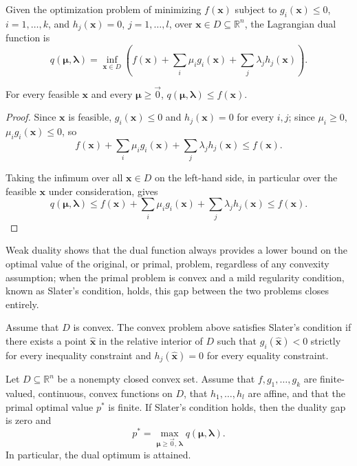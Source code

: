 \begin{definition}
Given the optimization problem of minimizing $f(\mathbf{x})$ subject to $g_i(\mathbf{x}) \leq 0$, $i=1,\dots,k$, and $h_j(\mathbf{x})=0$, $j=1,\dots,l$, over $\mathbf{x} \in D \subseteq \mathbb{R}^n$, the Lagrangian dual function is
\[
q(\boldsymbol{\mu}, \boldsymbol{\lambda}) = \inf_{\mathbf{x} \in D} \left( f(\mathbf{x}) + \sum_i \mu_i g_i(\mathbf{x}) + \sum_j \lambda_j h_j(\mathbf{x}) \right).
\]

\end{definition}

\begin{theorem}
For every feasible $\mathbf{x}$ and every $\boldsymbol{\mu} \geq \vec{0}$, $q(\boldsymbol{\mu},\boldsymbol{\lambda}) \leq f(\mathbf{x})$.
\end{theorem}

\begin{proof}
Since $\mathbf{x}$ is feasible, $g_i(\mathbf{x}) \leq 0$ and $h_j(\mathbf{x})=0$ for every $i,j$; since $\mu_i \geq 0$, $\mu_i g_i(\mathbf{x}) \leq 0$, so
\[
f(\mathbf{x}) + \sum_i \mu_i g_i(\mathbf{x}) + \sum_j \lambda_j h_j(\mathbf{x}) \leq f(\mathbf{x}).
\]

Taking the infimum over all $\mathbf{x} \in D$ on the left-hand side, in particular over the feasible $\mathbf{x}$ under consideration, gives
\[
q(\boldsymbol{\mu},\boldsymbol{\lambda}) \leq f(\mathbf{x}) + \sum_i \mu_i g_i(\mathbf{x}) + \sum_j \lambda_j h_j(\mathbf{x}) \leq f(\mathbf{x}).
\]

\end{proof}

Weak duality shows that the dual function always provides a lower bound on the optimal value of the original, or primal, problem, regardless of any convexity assumption; when the primal problem is convex and a mild regularity condition, known as Slater's condition, holds, this gap between the two problems closes entirely.

\begin{definition}
Assume that $D$ is convex. The convex problem above satisfies Slater's condition if there exists a point $\hat{\mathbf{x}}$ in the relative interior of $D$ such that $g_i(\hat{\mathbf{x}}) < 0$ strictly for every inequality constraint and $h_j(\hat{\mathbf{x}}) = 0$ for every equality constraint.
\end{definition}

\begin{theorem}
Let $D\subseteq\mathbb{R}^n$ be a nonempty closed convex set. Assume that $f,g_1,\dots,g_k$ are finite-valued, continuous, convex functions on $D$, that $h_1,\dots,h_l$ are affine, and that the primal optimal value $p^*$ is finite. If Slater's condition holds, then the duality gap is zero and
\[
 p^* = \max_{\boldsymbol{\mu}\geq \vec{0},\,\boldsymbol{\lambda}}
 q(\boldsymbol{\mu},\boldsymbol{\lambda}).
\]
In particular, the dual optimum is attained.
\end{theorem}

